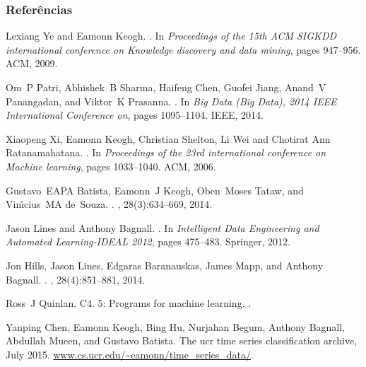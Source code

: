 \documentclass{beamer}
\begin{document}
\begin{frame}[allowframebreaks] 
\frametitle{Refer{\^e}ncias}
\footnotesize{
\begin{thebibliography}{99}
Lexiang Ye and Eamonn Keogh.
.
\newblock In {\em {Proceedings of the 15th ACM SIGKDD international conference
  on Knowledge discovery and data mining}}, pages {947--956}. ACM, 2009.

Om~P Patri, Abhishek~B Sharma, Haifeng Chen, Guofei Jiang, Anand~V Panangadan,
  and Viktor~K Prasanna.
.
\newblock In {\em {Big Data (Big Data), 2014 IEEE International Conference
  on}}, pages 1095--1104. {IEEE}, 2014.
  
Xiaopeng Xi, Eamonn Keogh, Christian Shelton, Li Wei and Chotirat Ann Ratanamahatana.
.
\newblock In {\em {Proceedings of the 23rd international conference on Machine learning}}, pages {1033--1040}. ACM, 2006.

Gustavo~EAPA Batista, Eamonn~J Keogh, Oben~Moses Tataw, and Vin{\'\i}cius~MA
  de~Souza.
.
, 28(3):{634--669}, 2014.

Jason Lines and Anthony Bagnall.
.
\newblock In {\em {Intelligent Data Engineering and Automated Learning-IDEAL
  2012}}, pages {475--483}. {Springer}, 2012.

Jon Hills, Jason Lines, Edgaras Baranauskas, James Mapp, and Anthony Bagnall.
.
, 28(4):851--881, 2014.

Ross~J Quinlan.
\newblock C4. 5: Programs for machine learning.
.

Yanping Chen, Eamonn Keogh, Bing Hu, Nurjahan Begum, Anthony Bagnall, Abdullah
  Mueen, and Gustavo Batista.
\newblock The ucr time series classification archive, July 2015.
\newblock \url{www.cs.ucr.edu/~eamonn/time_series_data/}.
\end{thebibliography}
}
\end{frame}

\end{document}
